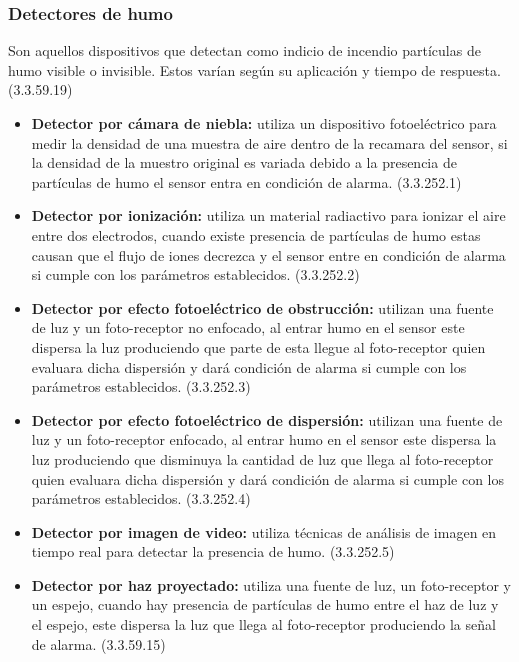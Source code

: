 \subsubsection{Detectores de humo}

Son aquellos dispositivos que detectan como indicio de incendio partículas de humo visible o invisible. Estos varían según su aplicación y tiempo de respuesta. (3.3.59.19)

\begin{itemize}
	
	\item \textbf{Detector por cámara de niebla:} utiliza un dispositivo fotoeléctrico para medir la densidad de una muestra de aire dentro de la recamara del sensor, si la densidad de la muestro original es variada debido a la presencia de partículas de humo el sensor entra en condición de alarma. (3.3.252.1)
	
	
	\item \textbf{Detector por ionización:} utiliza un material radiactivo para ionizar el aire entre dos electrodos, cuando existe presencia de partículas de humo estas causan que el flujo de iones decrezca y el sensor entre en condición de alarma si cumple con los parámetros establecidos. (3.3.252.2)
	
	
	\item \textbf{Detector por efecto fotoeléctrico de obstrucción:} utilizan una fuente de luz y un foto-receptor no enfocado, al entrar humo en el sensor este dispersa la luz produciendo que parte de esta llegue al foto-receptor quien evaluara dicha dispersión y dará condición de alarma si cumple con los parámetros establecidos. (3.3.252.3)
	
	\item \textbf{Detector por efecto fotoeléctrico de dispersión:} utilizan una fuente de luz y un foto-receptor enfocado, al entrar humo en el sensor este dispersa la luz produciendo que disminuya la cantidad de luz que llega al foto-receptor quien evaluara dicha dispersión y dará condición de alarma si cumple con los parámetros establecidos. (3.3.252.4)

	\item \textbf{Detector por imagen de video:} utiliza técnicas de análisis de imagen en tiempo real para detectar la presencia de humo. (3.3.252.5)
	
	\item \textbf{Detector por haz proyectado:} utiliza una fuente de luz, un foto-receptor y un espejo, cuando hay presencia de partículas de humo entre el haz de luz y el espejo, este dispersa la luz que llega al foto-receptor produciendo la señal de alarma. (3.3.59.15)


\end{itemize}
